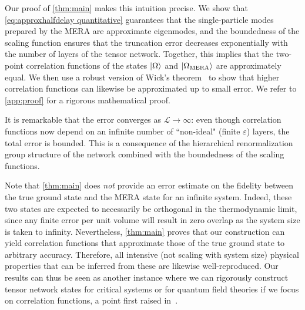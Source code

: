 \documentclass[aps,pra,reprint,superscriptaddress,floatfix,amsmath,amssymb,amsfonts]{revtex4-1}
\begin{document}
Our proof of \cref{thm:main} makes this intuition precise.
We show that \cref{eq:approxhalfdelay quantitative} guarantees that the single-particle modes prepared by the MERA are approximate eigenmodes, and the boundedness of the scaling function ensures that the truncation error decreases exponentially with the number of layers of the tensor network.
Together, this implies that the two-point correlation functions of the states $\ket\Omega$ and $\ket{\Omega_{\text{MERA}}}$ are approximately equal.
We then use a robust version of Wick's theorem~\cite{powers1970free} to show that higher correlation functions can likewise be approximated up to small error.
We refer to \cref{app:proof} for a rigorous mathematical proof.

It is remarkable that the error converges as $\mathcal L\to\infty$: even though correlation functions now depend on an infinite number of ``non-ideal" (finite $\varepsilon$) layers, the total error is bounded. This is a consequence of the hierarchical renormalization group structure of the network combined with the boundedness of the scaling functions.

Note that \cref{thm:main} does \emph{not} provide an error estimate on the fidelity between the true ground state and the MERA state for an infinite system.
Indeed, these two states are expected to necessarily be orthogonal in the thermodynamic limit, since any finite error per unit volume will result in zero overlap as the system size is taken to infinity.
Nevertheless, \cref{thm:main} proves that our construction can yield correlation functions that approximate those of the true ground state to arbitrary accuracy.
Therefore, all intensive (not scaling with system size) physical properties that can be inferred from these are likewise well-reproduced.
Our results can thus be seen as another instance where we can rigorously construct tensor network states for critical systems or for quantum field theories if we focus on correlation functions, a point first raised in~\cite{Koenig_2017,Koenig_2016}.
\end{document}
